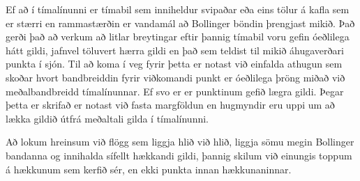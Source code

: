 \documentclass[11pt]{article}
\begin{document}
Ef að í tímalínunni er tímabil sem inniheldur svipaðar eða eins tölur á kafla sem er stærri en rammastærðin er vandamál að Bollinger 
böndin þrengjast mikið. Það gerði það að verkum að litlar breytingar eftir þannig tímabil voru gefin óeðlilega hátt gildi, 
jafnvel töluvert hærra gildi en það sem teldist til mikið áhugaverðari punkta í sjón. Til að koma í veg fyrir þetta er notast við
einfalda athugun sem skoðar hvort bandbreiddin fyrir viðkomandi punkt er óeðlilega þröng miðað við meðalbandbreidd tímalínunnar.
Ef svo er er punktinum gefið lægra gildi. Þegar þetta er skrifað er notast við fasta margföldun en hugmyndir eru uppi um að lækka 
gildið útfrá meðaltali gilda í tímalínunni.

Að lokum hreinsum við flögg sem liggja hlið við hlið, liggja sömu megin Bollinger bandanna og innihalda sífellt hækkandi gildi, 
þannig skilum við einungis toppum á hækkunum sem kerfið sér, en ekki punkta innan hækkunaninnar.

 
\end{document}
